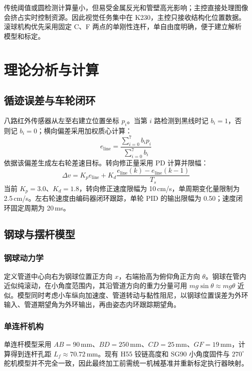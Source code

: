 \documentclass[UTF8,a4paper,12pt]{ctexart}
\begin{document}
传统阈值或圆检测计算量小，但易受金属反光和管壁高光影响；主控直接处理图像会挤占实时控制资源。因此视觉任务集中在 K230，主控只接收结构化位置数据。滚球机构优先采用固定 C、F 两点的单刚性连杆，单自由度明确，便于建立解析模型和标定。

\section{理论分析与计算}

\subsection{循迹误差与车轮闭环}

八路红外传感器从左至右建立位置坐标 $p_i$。当第 $i$ 路检测到黑线时记 $b_i=1$，否则记 $b_i=0$；横向偏差采用加权质心计算：
\begin{equation}
  e_{\mathrm{line}}=\frac{\sum_{i=0}^{7}b_i p_i}{\sum_{i=0}^{7}b_i}
  \label{eq:line-error}
\end{equation}
依据该偏差生成左右轮差速目标。转向修正量采用 PD 计算并限幅：
\begin{equation}
  \Delta v=K_p e_{\mathrm{line}}+K_d\frac{e_{\mathrm{line}}(k)-e_{\mathrm{line}}(k-1)}{T_s}
  \label{eq:line-pd}
\end{equation}
当前 $K_p=3.0$、$K_d=1.8$，转向修正速度限幅为 10\,cm/s，单周期变化量限制为 2.5\,cm/s。左右轮速度由编码器闭环跟踪，单轮 PID 的输出限幅为 0.50；速度闭环固定周期为 20\,ms。

\subsection{钢球与摆杆模型}

\subsubsection{钢球动力学}

定义管道中心向右为钢球位置正方向 $x$，右端抬高为俯仰角正方向 $\theta$。钢球在管内近似纯滚动，在小角度范围内，其沿管道方向的重力分量可用 $mg\sin\theta\approx mg\theta$ 近似。模型同时考虑小车纵向加速度、管道转动与黏性阻尼，以钢球位置误差为外环输入、管道期望角为外环输出，再由姿态内环跟踪期望角。

\subsubsection{单连杆机构}

单连杆模型采用 $AB=90\,\mathrm{mm}$、$BD=250\,\mathrm{mm}$、$CD=25\,\mathrm{mm}$、$GF=19\,\mathrm{mm}$，计算得到连杆孔距 $L_f\approx70.72\,\mathrm{mm}$。现有 H55 铰链高度和 SG90 小角度固件与 $270^\circ$ 舵机模型并不完全一致，因此最终加工前需统一机械基准并重新标定执行器映射。
\end{document}
